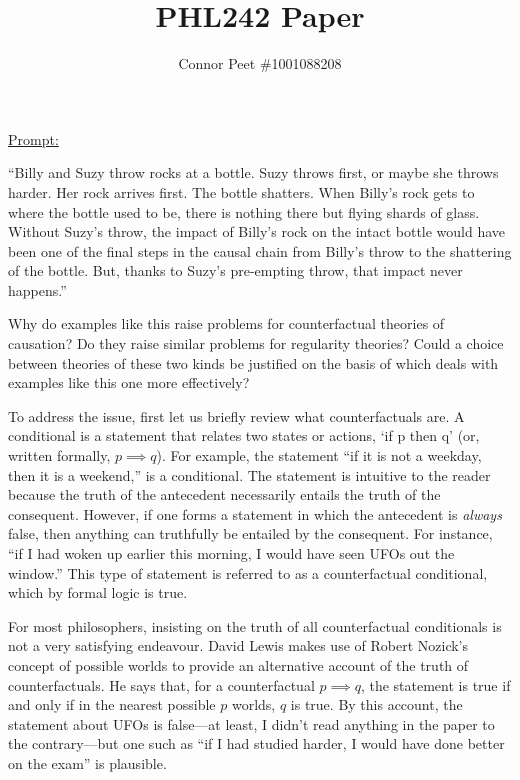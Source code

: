 \documentclass{article}
\title{PHL242 Paper}
\author{Connor Peet \#1001088208}
\begin{document}
\maketitle

\underline{Prompt:}
\begin{displayquote}
``Billy and Suzy throw rocks at a bottle. Suzy throws first, or maybe she throws harder. Her rock arrives first. The bottle shatters. When Billy's rock gets to where the bottle used to be, there is nothing there but flying shards of glass. Without Suzy's throw, the impact of Billy's rock on the intact bottle would have been one of the final steps in the causal chain from Billy's throw to the shattering of the bottle. But, thanks to Suzy's pre-empting throw, that impact never happens.''

Why do examples like this raise problems for counterfactual theories of causation? Do they raise similar problems for regularity theories? Could a choice between theories of these two kinds be justified on the basis of which deals with examples like this one more effectively?
\end{displayquote}

To address the issue, first let us briefly review what counterfactuals are. A conditional is a statement that relates two states or actions, `if p then q' (or, written formally, $p \implies q$). For example, the statement ``if it is not a weekday, then it is a weekend,'' is a conditional. The statement is intuitive to the reader because the truth of the antecedent necessarily entails the truth of the consequent. However, if one forms a statement in which the antecedent is \textit{always} false, then anything can truthfully be entailed by the consequent. For instance, ``if I had woken up earlier this morning, I would have seen UFOs out the window.'' This type of statement is referred to as a counterfactual conditional, which by formal logic is true.

For most philosophers, insisting on the truth of all counterfactual conditionals is not a very satisfying endeavour. David Lewis makes use of Robert Nozick's concept of possible worlds to provide an alternative account of the truth of counterfactuals. He says that, for a counterfactual $p \implies q$, the statement is true if and only if in the nearest possible $p$ worlds, $q$ is true. By this account, the statement about UFOs is false---at least, I didn't read anything in the paper to the contrary---but one such as ``if I had studied harder, I would have done better on the exam'' is plausible.
\end{document}
